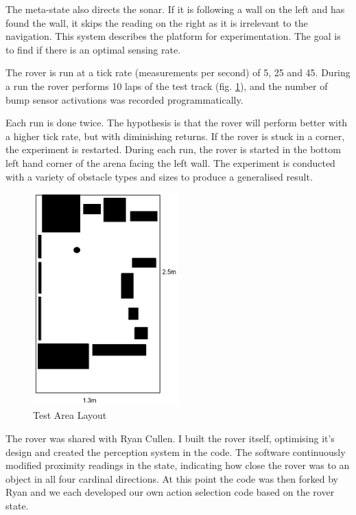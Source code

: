 \documentclass[a4paper,12pt,twocolumn]{report}
\begin{document}
The meta-state also directs the sonar. If it is following a wall on the left and has found the wall, it skips the reading on the right as it is irrelevant to the navigation. This system describes the platform for experimentation. The goal is to find if there is an optimal sensing rate.

The rover is run at a tick rate (measurements per second) of 5, 25 and 45. During a run the rover performs 10 laps of the test track (fig. \ref{fig:area}), and the number of bump sensor activations was recorded programmatically.

Each run is done twice. The hypothesis is that the rover will perform better with a higher tick rate, but with diminishing returns. If the rover is stuck in a corner, the experiment is restarted. During each run, the rover is started in the bottom left hand corner of the arena facing the left wall. The experiment is conducted with a variety of obstacle types and sizes to produce a generalised result.

\begin{figure}[t]
 \includegraphics[width=0.5\textwidth]{test-area-layout}
 \caption{Test Area Layout}
 \label{fig:area}
\end{figure}

The rover was shared with Ryan Cullen. I built the rover itself, optimising it's design and created the perception system in the code. The software continuously modified proximity readings in the state, indicating how close the rover was to an object in all four cardinal directions. At this point the code was then forked by Ryan and we each developed our own action selection code based on the rover state.
\end{document}
